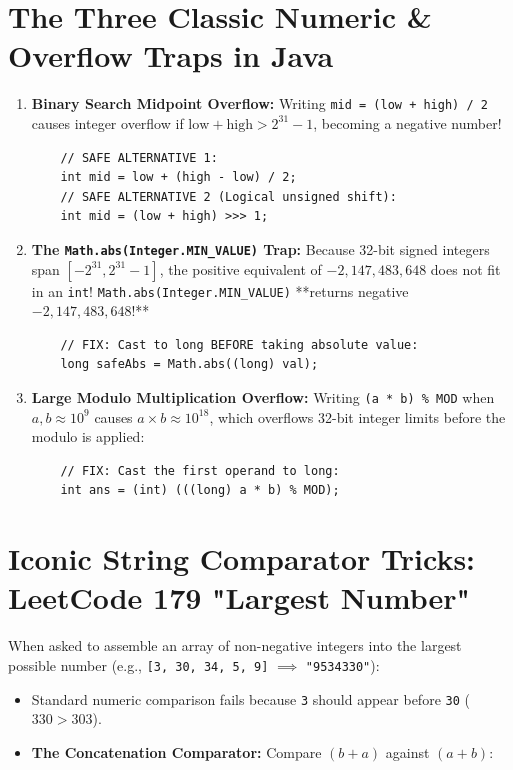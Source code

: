 \documentclass[10pt,journal,compsoc,onecolumn]{IEEEtran}
\begin{document}
\section{The Three Classic Numeric \& Overflow Traps in Java}
\label{sec:numeric_traps}

\begin{enumerate}
    \item \textbf{Binary Search Midpoint Overflow:}
    Writing \texttt{mid = (low + high) / 2} causes integer overflow if $\text{low} + \text{high} > 2^{31} - 1$, becoming a negative number!
    \begin{verbatim}
    // SAFE ALTERNATIVE 1:
    int mid = low + (high - low) / 2;
    // SAFE ALTERNATIVE 2 (Logical unsigned shift):
    int mid = (low + high) >>> 1;
    \end{verbatim}

    \item \textbf{The \texttt{Math.abs(Integer.MIN\_VALUE)} Trap:}
    Because 32-bit signed integers span $[-2^{31}, 2^{31} - 1]$, the positive equivalent of $-2{,}147{,}483{,}648$ does not fit in an \texttt{int}! \texttt{Math.abs(Integer.MIN\_VALUE)} **returns negative $-2{,}147{,}483{,}648$!**
    \begin{verbatim}
    // FIX: Cast to long BEFORE taking absolute value:
    long safeAbs = Math.abs((long) val);
    \end{verbatim}

    \item \textbf{Large Modulo Multiplication Overflow:}
    Writing \texttt{(a * b) \% MOD} when $a, b \approx 10^9$ causes $a \times b \approx 10^{18}$, which overflows 32-bit integer limits before the modulo is applied:
    \begin{verbatim}
    // FIX: Cast the first operand to long:
    int ans = (int) (((long) a * b) % MOD);
    \end{verbatim}
\end{enumerate}

\section{Iconic String Comparator Tricks: LeetCode 179 "Largest Number"}
\label{sec:string_comparator}

When asked to assemble an array of non-negative integers into the largest possible number (e.g., \texttt{[3, 30, 34, 5, 9]} $\implies$ \texttt{"9534330"}):
\begin{itemize}
    \item Standard numeric comparison fails because \texttt{3} should appear before \texttt{30} ($330 > 303$).
    \item \textbf{The Concatenation Comparator:} Compare $(b + a)$ against $(a + b)$:
\end{itemize}
\end{document}
